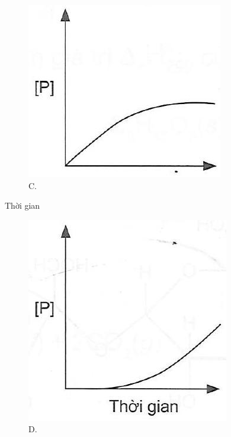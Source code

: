 \documentclass[10pt]{article}
\begin{document}
\begin{figure}[h]
\begin{center}
\captionsetup{labelformat=empty}
\caption{C.}
  \includegraphics[width=\textwidth]{2025_10_23_de6f5713836e4e91b3c8g-037(2)}
\end{center}
\end{figure}

Thời gian

\begin{figure}[h]
\begin{center}
\captionsetup{labelformat=empty}
\caption{D.}
  \includegraphics[width=\textwidth]{2025_10_23_de6f5713836e4e91b3c8g-037(3)}
\end{center}
\end{figure}
\end{document}
